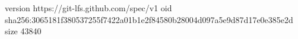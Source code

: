 version https://git-lfs.github.com/spec/v1
oid sha256:3065181f380537255f7422a01b1e2f84580b28004d097a5e9d87d17e0e385e2d
size 43840
